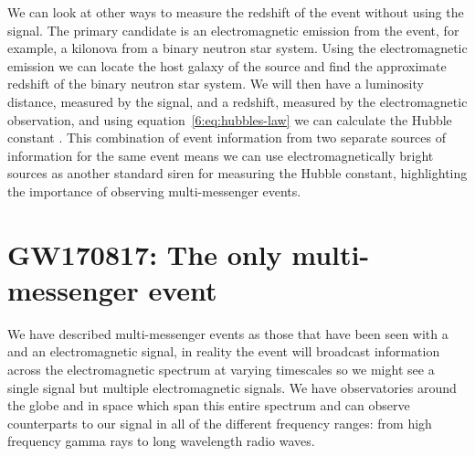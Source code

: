 We can look at other ways to measure the redshift of the event without using the \gwadj signal. The primary candidate is an electromagnetic emission from the event, for example, a kilonova from a binary neutron star system. Using the electromagnetic emission we can locate the host galaxy of the source and find the approximate redshift of the binary neutron star system. We will then have a luminosity distance, measured by the \gwadj signal, and a redshift, measured by the electromagnetic observation, and using equation~\ref{6:eq:hubbles-law} we can calculate the Hubble constant . This combination of event information from two separate sources of information for the same event means we can use electromagnetically bright \gwadj sources as another standard siren for measuring the Hubble constant, highlighting the importance of observing multi-messenger events.

\section{\label{6:sec:gw170817}GW170817: The only multi-messenger event}

We have described multi-messenger events as those that have been seen with a \gw and an electromagnetic signal, in reality the event will broadcast information across the electromagnetic spectrum at varying timescales so we might see a single \gwadj signal but multiple electromagnetic signals. We have observatories around the globe and in space which span this entire spectrum and can observe counterparts to our \gwadj signal in all of the different frequency ranges: from high frequency gamma rays to long wavelength radio waves. 

